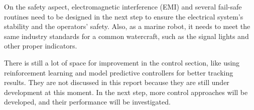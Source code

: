 On the safety aspect, electromagnetic interference (EMI) and several fail-safe routines need to be designed in the next step to ensure the electrical system's stability and the operators' safety. Also, as a marine robot, it needs to meet the same industry standards for a common watercraft, such as the signal lights and other proper indicators.

There is still a lot of space for improvement in the control section, like using reinforcement learning and model predictive controllers for better tracking results. They are not discussed in this report because they are still under development at this moment. In the next step, more control approaches will be developed, and their performance will be investigated.